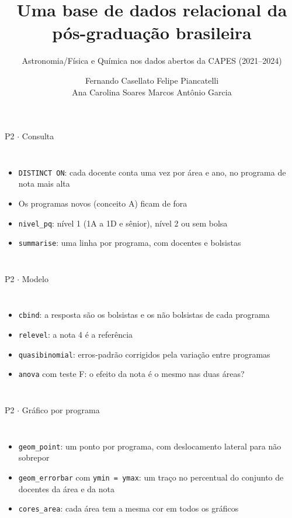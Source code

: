 \documentclass[aspectratio=169,10pt]{beamer}
\title{Uma base de dados relacional da pós-graduação brasileira}
\subtitle{Astronomia/Física e Química nos dados abertos da CAPES (2021--2024)}
\author{Fernando Casellato \quad Felipe Piancatelli\\[0.2em] Ana Carolina Soares \quad Marcos Antônio Garcia}
\institute{Ferramentas Computacionais \\ Docente: Thomas Nogueira Vilches}
\date{}
\newcommand{\trecho}[2][codigo]{}
\newcommand{\cod}[1]{\texttt{#1}}
\begin{document}
\begin{frame}{P2 $\cdot$ Consulta}
  \begin{columns}[T]
    \trecho[codigomenor]{p2_consulta.R}
    \vspace{0.4em}
    \trecho[codigomenor]{p2_prog.R}
    \small
    \begin{itemize}
      \item \cod{DISTINCT ON}: cada docente conta uma vez por área e ano, no programa de nota mais alta
      \item Os programas novos (conceito A) ficam de fora
      \item \cod{nivel\_pq}: nível 1 (1A a 1D e sênior), nível 2 ou sem bolsa
      \item \cod{summarise}: uma linha por programa, com docentes e bolsistas
    \end{itemize}
  \end{columns}
\end{frame}

\begin{frame}{P2 $\cdot$ Modelo}
  \begin{columns}[T]
    \trecho[codigomaior]{p2_modelo.R}
    \vspace{0.6em}
    \trecho[codigomaior]{p2_interacao.R}
    \small
    \begin{itemize}
      \item \cod{cbind}: a resposta são os bolsistas e os não bolsistas de cada programa
      \item \cod{relevel}: a nota 4 é a referência
      \item \cod{quasibinomial}: erros-padrão corrigidos pela variação entre programas
      \item \cod{anova} com teste F: o efeito da nota é o mesmo nas duas áreas?
    \end{itemize}
  \end{columns}
\end{frame}

\begin{frame}{P2 $\cdot$ Gráfico por programa}
  \begin{columns}[T]
    \trecho[codigomedio]{p2_ggplot.R}
    \small
    \begin{itemize}
      \item \cod{geom\_point}: um ponto por programa, com deslocamento lateral para não sobrepor
      \item \cod{geom\_errorbar} com \cod{ymin = ymax}: um traço no percentual do conjunto de docentes da área e da nota
      \item \cod{cores\_area}: cada área tem a mesma cor em todos os gráficos
    \end{itemize}
  \end{columns}
\end{frame}
\end{document}

